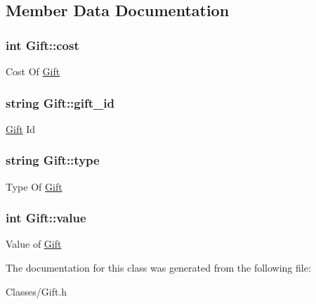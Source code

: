 \subsection{Member Data Documentation}
\hypertarget{class_gift_ad110c98fdaca7cbf83829bbc2a5cfd15}{
\subsubsection[{cost}]{\setlength{\rightskip}{0pt plus 5cm}int Gift\-::cost}}\label{class_gift_ad110c98fdaca7cbf83829bbc2a5cfd15}
Cost Of \hyperlink{class_gift}{Gift} \hypertarget{class_gift_af84fa1865956d2e86dbba115102559a7}{
\subsubsection[{gift\-\_\-id}]{\setlength{\rightskip}{0pt plus 5cm}string Gift\-::gift\-\_\-id}}\label{class_gift_af84fa1865956d2e86dbba115102559a7}
\hyperlink{class_gift}{Gift} Id \hypertarget{class_gift_a80ea42010282475cb1c02f3eeba89c41}{
\subsubsection[{type}]{\setlength{\rightskip}{0pt plus 5cm}string Gift\-::type}}\label{class_gift_a80ea42010282475cb1c02f3eeba89c41}
Type Of \hyperlink{class_gift}{Gift} \hypertarget{class_gift_a71d14b92ebfd06993afe584f088bc748}{
\subsubsection[{value}]{\setlength{\rightskip}{0pt plus 5cm}int Gift\-::value}}\label{class_gift_a71d14b92ebfd06993afe584f088bc748}
Value of \hyperlink{class_gift}{Gift} 

The documentation for this class was generated from the following file\-:\begin{DoxyCompactItemize}
\item 
Classes/Gift.\-h\end{DoxyCompactItemize}
